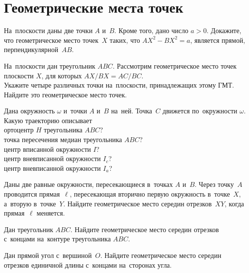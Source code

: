 
\section*{Геометрические места точек}


\begin{problems}

\item
На~плоскости даны две точки $A$ и~$B$.
Кроме того, дано число $a > 0$.
Докажите, что геометрическое место точек~$X$ таких, что $AX^2 - BX^2 = a$,
является прямой, перпендикулярной~$AB$.

\item
На~плоскости дан треугольник $ABC$.
Рассмотрим геометрическое место точек плоскости $X$, для которых
$AX / BX = AC / BC$.
\\
\sp
Укажите четыре различных точки на~плоскости, принадлежащих этому ГМТ.
\\
\sp
Найдите это геометрическое место точек.

\item
Дана окружность $\omega$ и~точки $A$ и~$B$ на~ней.
Точка~$C$ движется по~окружности $\omega$.
Какую траекторию описывает
\\
\sp ортоцентр $H$ треугольника $ABC$?
\\
\sp точка пересечения медиан треугольника $ABC$?
\\
\sp центр вписанной окружности $I$?
\\
\sp центр вневписанной окружности $I_{c}$?
\\
\sp центр вневписанной окружности $I_{a}$?

\item
Даны две равные окружности, пересекающиеся в~точках $A$ и~$B$.
Через точку~$A$ проводится прямая~$\ell$, пересекающая вторично первую
окружность в~точке~$X$, а~вторую в~точке~$Y$.
Найдите геометрическое место середин отрезков~$XY$, когда прямая~$\ell$
меняется.

\item
Дан треугольник $ABC$.
Найдите геометрическое место середин отрезков с~концами на~контуре
треугольника $ABC$.

\item
Дан прямой угол с~вершиной~$O$.
Найдите геометрическое место середин отрезков единичной длины с~концами
на~сторонах угла.

\end{problems}


